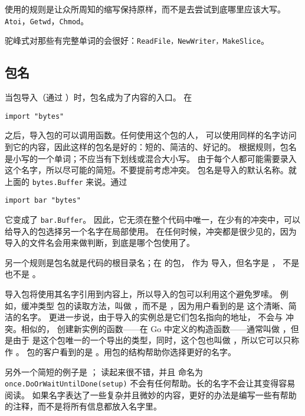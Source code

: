 使用的规则是让众所周知的缩写保持原样，而不是去尝试到底哪里应该大写。
\lstinline{Atoi}，\lstinline{Getwd}，\lstinline{Chmod}。

驼峰式对那些有完整单词的会很好：\lstinline{ReadFile，NewWriter，MakeSlice}。

\subsection{包名}
当包导入（通过 ）时，包名成为了内容的入口。
在 
\begin{lstlisting}
import "bytes"
\end{lstlisting}
之后，导入包的可以调用函数。任何使用这个包的人，
可以使用同样的名字访问到它的内容，因此这样的包名是好的：短的、简洁的、好记的。
根据规则，包名是小写的一个单词；不应当有下划线或混合大小写。
由于每个人都可能需要录入这个名字，所以尽可能的简短。不要提前考虑冲突。
包名是导入的默认名称。就上面的 \lstinline{bytes.Buffer} 来说。通过 
\begin{lstlisting}
import bar "bytes"
\end{lstlisting}
它变成了 \lstinline{bar.Buffer}。
因此，它无须在整个代码中唯一，在少有的冲突中，可以给导入的包选择另一个名字在局部使用。
在任何时候，冲突都是很少见的，因为导入的文件名会用来做判断，到底是哪个包使用了。

另一个规则是包名就是代码的根目录名；在  的包，
作为  导入，但名字是 ，
不是  也不是 。

导入包将使用其名字引用到内容上，所以导入的包可以利用这个避免罗嗦。
例如，缓冲类型  包的读取方法，叫做 ，而不是
，因为用户看到的是  这个清晰、简洁的名字。
更进一步说，由于导入的实例总是它们包名指向的地址， 不会与
 冲突。相似的， 创建新实例的函数——在 Go 中定义的构造函数——通常叫做
，但是由于  是这个包唯一的一个导出的类型，同时，这个包也叫做
，所以它可以只称作 。
包的客户看到的是 。用包的结构帮助你选择更好的名字。

另外一个简短的例子是 ； 读起来很不错，并且
命名为 \lstinline{once.DoOrWaitUntilDone(setup)} 不会有任何帮助。长的名字不会让其变得容易阅读。
如果名字表达了一些复杂并且微妙的内容，更好的办法是编写一些有帮助的注释，而不是将所有信息都放入名字里。

